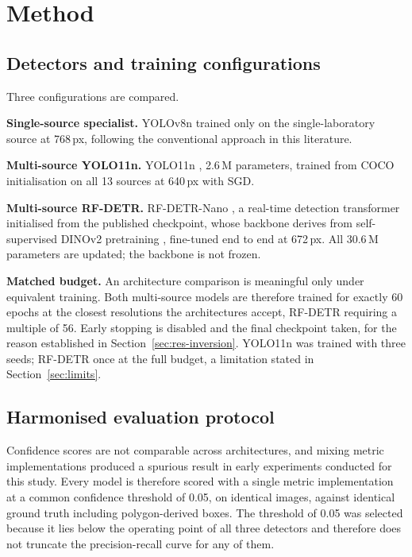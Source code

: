 \documentclass[conference]{IEEEtran}
\begin{document}
\section{Method}

\subsection{Detectors and training configurations}
Three configurations are compared.

\textbf{Single-source specialist.} YOLOv8n trained only on the single-laboratory
source at 768\,px, following the conventional approach in this literature.

\textbf{Multi-source YOLO11n.} YOLO11n \cite{yolo11}, 2.6\,M parameters, trained
from COCO initialisation \cite{lin2014coco} on all 13 sources at 640\,px with SGD.

\textbf{Multi-source RF-DETR.} RF-DETR-Nano \cite{rfdetr}, a real-time detection
transformer \cite{carion2020detr} initialised from the published checkpoint, whose
backbone derives from self-supervised DINOv2 pretraining \cite{dinov2}, fine-tuned end
to end at 672\,px. All 30.6\,M parameters are updated; the backbone is not frozen.

\textbf{Matched budget.} An architecture comparison is meaningful only under
equivalent training. Both multi-source models are therefore trained for exactly 60
epochs at the closest resolutions the architectures accept, RF-DETR requiring a
multiple of 56. Early stopping is disabled and the final checkpoint taken, for the
reason established in Section~\ref{sec:res-inversion}. YOLO11n was trained with three
seeds; RF-DETR once at the full budget, a limitation stated in
Section~\ref{sec:limits}.

\subsection{Harmonised evaluation protocol}
Confidence scores are not comparable across architectures, and mixing metric
implementations produced a spurious result in early experiments conducted for
this study. Every model is therefore scored with a single metric implementation
at a common confidence threshold of 0.05, on identical images, against identical
ground truth including polygon-derived boxes. The threshold of 0.05 was selected
because it lies below the operating point of all three detectors and therefore
does not truncate the precision-recall curve for any of them.
\end{document}
